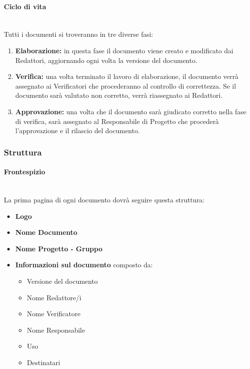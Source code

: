 \documentclass[11pt,a4paper]{article}
\begin{document}
	\paragraph{Ciclo di vita}
		\noindent \\Tutti i documenti si troveranno in tre diverse fasi:
	\begin{enumerate}
	\item \textbf{Elaborazione:} in questa fase il documento viene creato e modificato dai Redattori, aggiornando ogni volta la versione del documento. 
	\item \textbf{Verifica:} una volta terminato il lavoro di elaborazione, il documento verrà assegnato ai Verificatori che procederanno al controllo di correttezza. Se il documento sarà valutato non corretto, verrà riassegnato ai Redattori.
	\item \textbf{Approvazione:} una volta che il documento sarà giudicato corretto nella fase di verifica, sarà assegnato al Responsabile di Progetto che procederà l'approvazione e il rilascio del documento.
	\end{enumerate}
	
	\subsubsection{Struttura}
	
	\paragraph{Frontespizio} 
	\noindent \\La prima pagina di ogni documento dovrà seguire questa struttura:
	\begin{itemize}
	\item \textbf{Logo}
	\item \textbf{Nome Documento}
	\item \textbf{Nome Progetto - Gruppo}
	\item \textbf{Informazioni sul documento} composto da:
	\begin{itemize}
		\item  Versione del documento 
		\item Nome Redattore/i
		\item Nome Verificatore
		\item  Nome Responsabile
		\item  Uso
		\item Destinatari
	\end{itemize}
	\end{itemize}
\end{document}
